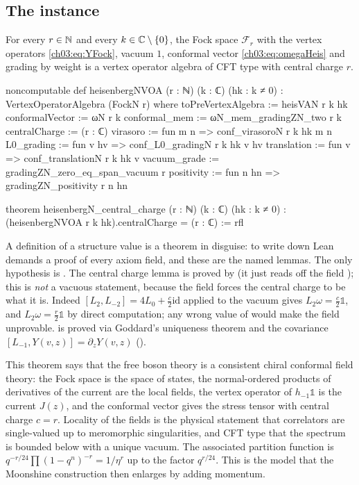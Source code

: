 \subsection{The instance}

\begin{theorem}\label{ch03:thm:heisVOA}
For every $r\in{\mathbb{N}}$ and every $k\in{\mathbb{C}}\setminus\{0\}$, the Fock space $\mathcal F_r$ with the
vertex operators \eqref{ch03:eq:YFock}, vacuum $1$, conformal vector \eqref{ch03:eq:omegaHeis}
and grading by weight is a vertex operator algebra of CFT type with central charge $r$.
\end{theorem}
\begin{leancode}
noncomputable def heisenbergNVOA (r : ℕ) (k : ℂ) (hk : k ≠ 0) :
    VertexOperatorAlgebra (FockN r) where
  toPreVertexAlgebra := heisVAN r k hk
  conformalVector := ωN r k
  conformal_mem := ωN_mem_gradingZN_two r k
  centralCharge := (r : ℂ)
  virasoro := fun m n => conf_virasoroN r k hk m n
  L0_grading := fun v hv => conf_L0_gradingN r k hk v hv
  translation := fun v => conf_translationN r k hk v
  vacuum_grade := gradingZN_zero_eq_span_vacuum r
  positivity := fun n hn => gradingZN_positivity r n hn

theorem heisenbergN_central_charge (r : ℕ) (k : ℂ) (hk : k ≠ 0) :
    (heisenbergNVOA r k hk).centralCharge = (r : ℂ) := rfl
\end{leancode}

\begin{dictionary}
A definition of a structure value is a theorem in disguise: to write down
 Lean demands a proof of every axiom field, and these are the named lemmas.
The only hypothesis is . The central charge lemma is proved by  (it
just reads off the field ); this is \emph{not} a vacuous statement, because
the field  forces the central charge to be what it is. Indeed $[L_2,L_{-2}]=4L_0+
\frac{c}{2}\mathrm{id}$ applied to the vacuum gives $L_2\omega=\frac c2\mathbb 1$, and
$L_2\omega=\frac r2\mathbb 1$ by direct computation; any wrong value of  would
make the  field unprovable.  is proved via Goddard's uniqueness
theorem and the covariance $[L_{-1},Y(v,z)]=\partial_zY(v,z)$ ().
\end{dictionary}

\begin{physics}
This theorem says that the free boson theory is a consistent chiral conformal field theory: the Fock space is the space of states, the normal-ordered products of derivatives of the current are the local fields, the vertex operator of $h_{-1}\mathbb 1$ is the current $J(z)$, and the conformal vector gives the stress tensor with central charge $c=r$. Locality of the fields is the physical statement that correlators are single-valued up to meromorphic singularities, and CFT type that the spectrum is bounded below with a unique vacuum. The associated partition function is $q^{-r/24}\prod(1-q^n)^{-r}=1/\eta^r$ up to the factor $q^{r/24}$. This is the model that the Moonshine construction then enlarges by adding momentum.
\end{physics}

